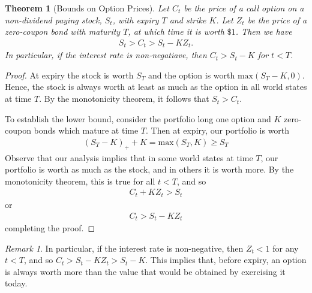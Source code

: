 \documentclass[12pt]{article}
\theoremstyle{plain}
\newtheorem{theorem}{Theorem}
\theoremstyle{definition}
\theoremstyle{remark}
\newtheorem*{remark}{Remark}
\numberwithin{equation}{section}  %
\begin{document}
\begin{theorem}[Bounds on Option Prices]\label{thm:bound-op-prices}
	Let $C_t$ be the price of a call option on a non-dividend paying stock, 
	$S_t$, with
	expiry $T$ and strike $K$. Let $Z_t$ be the price of a zero-coupon bond 
	with maturity $T$, at which time
	it is worth $\$1$. 
	Then we have
	\begin{equation*}
		\begin{split}
			S_{t} > C_{t} > S_{t} - K Z_{t}.
		\end{split}
	\end{equation*}
	In particular, if the interest rate is non-negatiave, then $C_{t} >
	S_{t} - K$ for $t < T$. 
\end{theorem}
\begin{proof}
	At expiry the stock is worth $S_{T}$ and the option is worth
	$\text{max}(S_{T} - K, 0)$. Hence, the stock is always worth at least as 
	much
	as the option in all world states at time $T$. By the monotonicity theorem, 
	it follows
	that $S_{t} > C_{t}$. 

	To establish the lower bound, consider the portfolio long one option and 
	$K$ zero-coupon bonds which
	mature at time $T$. Then at expiry, our portfolio is worth
	\begin{equation*}
		\begin{split}
			{(S_{T} - K)}_{+} + K =  \text{max}(S_{T}, K) \ge S_{T}
		\end{split}
	\end{equation*}
	Observe that our analysis implies that in some world states at time $T$, 
	our portfolio is worth as much as the stock, and in others it is worth 
	more. By the monotonicity theorem, this is true for all $t < T$, and so
	\begin{equation*}
		\begin{split}
			C_{t} + K Z_{t} > S_{t} 
		\end{split}
	\end{equation*}
	or
	\begin{equation*}
		\begin{split}
			C_{t} > S_{t} - K Z_{t}
		\end{split}
	\end{equation*}
	completing the proof.
\end{proof}
\begin{remark}\label{rem:nev-ex}
	In particular, if the interest rate is non-negative, then $Z_{t} < 1$ for 
	any $t < T$, and so
	$C_{t} > S_{t} - KZ_{t} > S_{t} - K$.
	This implies that, before expiry, an option is always 
	worth more than the value that would be obtained by exercising it today.
\end{remark}
\end{document}
